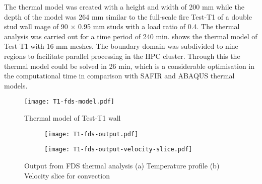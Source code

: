 The thermal model was created with a height and width of 200 mm while the depth of the model was 264 mm similar to the full-scale fire Test-T1 of a double stud wall mage of 90 $\times$ 0.95 mm studs with a load ratio of 0.4. The thermal analysis was carried out for a time period of 240 min.  shows the thermal model of Test-T1 with 16 mm meshes. The boundary domain was  subdivided to nine regions to facilitate parallel processing in the HPC cluster. Through this the thermal model could be solved in 26 min, which is a considerable optimisation in the computational time in comparison with SAFIR and ABAQUS thermal models.   
\begin{figure}[!htbp]
	\centering
		\texttt{[image: T1-fds-model.pdf]}
		\caption{Thermal model of Test-T1 wall}
		\label{fig:T1-fds-model}
\end{figure}
\begin{figure}[!htbp]
	\centering
	\begin{subfigure}[b]{0.45\textwidth}
		\centering
		\texttt{[image: T1-fds-output.pdf]}
		\caption{}
		\label{subfig:T1-fds-output}
	\end{subfigure}
	\begin{subfigure}[b]{0.45\textwidth}
		\centering
		\texttt{[image: T1-fds-output-velocity-slice.pdf]}
		\caption{}
		\label{subfig:T1-fds-output-velocity-slice}
	\end{subfigure}
	   \caption{Output from FDS thermal analysis (a) Temperature profile (b) Velocity slice for convection}
	   \label{fig:abaqus-output-pb-studs}
\end{figure}

